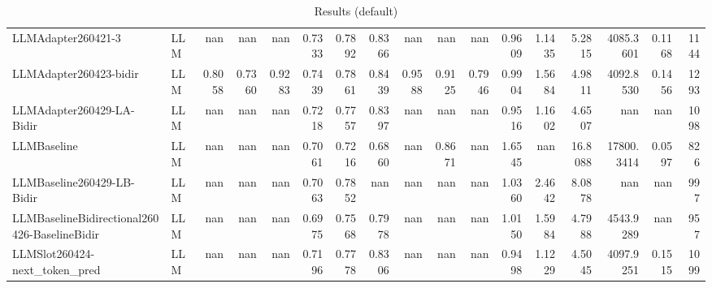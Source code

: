 \begin{table}[htbp]
{\begin{tabular}{ll|rrrrrrrrrrrrrr|r}
LLMAdapter260421-3 & LLM & nan & nan & nan & 0.7333 & 0.7892 & 0.8366 & nan & nan & nan & 0.9609 & 1.1435 & 5.2815 & 4085.3601 & 0.1168 & 1144 \\
LLMAdapter260423-bidir & LLM & 0.8058 & 0.7360 & 0.9283 & 0.7439 & 0.7861 & 0.8439 & 0.9588 & 0.9125 & 0.7946 & 0.9904 & 1.5684 & 4.9811 & 4092.8530 & 0.1456 & 1293 \\
LLMAdapter260429-LA-Bidir & LLM & nan & nan & nan & 0.7218 & 0.7757 & 0.8397 & nan & nan & nan & 0.9516 & 1.1602 & 4.6507 & nan & nan & 1098 \\
LLMBaseline & LLM & nan & nan & nan & 0.7061 & 0.7216 & 0.6860 & nan & 0.8671 & nan & 1.6545 & nan & 16.8088 & 17800.3414 & 0.0597 & 826 \\
LLMBaseline260429-LB-Bidir & LLM & nan & nan & nan & 0.7063 & 0.7852 & nan & nan & nan & nan & 1.0360 & 2.4642 & 8.0878 & nan & nan & 997 \\
LLMBaselineBidirectional260426-BaselineBidir & LLM & nan & nan & nan & 0.6975 & 0.7568 & 0.7978 & nan & nan & nan & 1.0150 & 1.5984 & 4.7988 & 4543.9289 & nan & 957 \\
LLMSlot260424-next\_token\_pred & LLM & nan & nan & nan & 0.7196 & 0.7778 & 0.8306 & nan & nan & nan & 0.9498 & 1.1229 & 4.5045 & 4097.9251 & 0.1515 & 1099 \\
\bottomrule
\end{tabular}
}
\caption{Results (default)}
\label{tab:results_default}
\end{table}